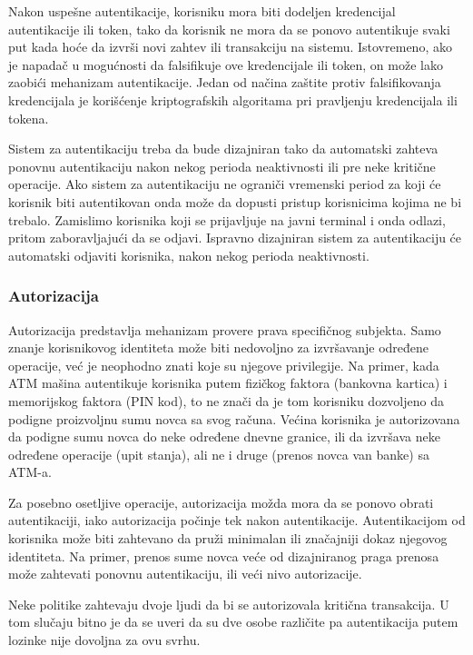 \documentclass[a4paper]{article}
\begin{document}
Nakon uspešne autentikacije, korisniku mora biti 
dodeljen kredencijal autentikacije ili token, tako da korisnik 
ne mora da se ponovo autentikuje svaki put kada hoće da izvrši novi zahtev ili transakciju na sistemu. 
Istovremeno, ako je napadač u mogućnosti da falsifikuje ove kredencijale ili token, on može lako zaobići 
mehanizam autentikacije. Jedan od načina zaštite protiv falsifikovanja kredencijala je korišćenje 
kriptografskih algoritama pri pravljenju kredencijala ili tokena.

Sistem za autentikaciju treba da bude dizajniran tako da automatski zahteva ponovnu autentikaciju nakon nekog 
perioda neaktivnosti ili pre neke kritične operacije.
Ako sistem za autentikaciju ne ograniči vremenski period za koji će korisnik biti autentikovan onda može 
da dopusti pristup korisnicima kojima ne bi trebalo. Zamislimo korisnika koji se prijavljuje na javni terminal
i onda odlazi, pritom zaboravljajući da se odjavi. Ispravno dizajniran sistem za autentikaciju 
će automatski odjaviti korisnika, nakon nekog perioda neaktivnosti.

\subsubsection{Autorizacija}
Autorizacija predstavlja mehanizam provere prava specifičnog subjekta.
Samo znanje korisnikovog identiteta može biti nedovoljno za izvršavanje određene operacije, već je neophodno znati koje su njegove privilegije.
Na primer, kada ATM mašina autentikuje korisnika putem fizičkog faktora (bankovna kartica) i memorijskog faktora (PIN kod),
to ne znači da je tom korisniku dozvoljeno da podigne proizvoljnu sumu novca sa svog računa. Većina korisnika je autorizovana 
da podigne sumu novca do neke određene dnevne granice, ili da izvršava neke određene operacije (upit stanja), 
ali ne i druge (prenos novca van banke) sa ATM-a.
 
Za posebno osetljive operacije, autorizacija možda mora da se ponovo obrati autentikaciji, iako autorizacija počinje tek 
nakon autentikacije. Autentikacijom od korisnika može biti zahtevano da pruži minimalan ili značajniji dokaz njegovog identiteta. 
Na primer, prenos sume novca veće od dizajniranog praga prenosa može zahtevati ponovnu autentikaciju, ili veći nivo autorizacije.

Neke politike zahtevaju dvoje ljudi da bi se autorizovala kritična transakcija. U tom slučaju 
bitno je da se uveri da su dve osobe različite pa autentikacija putem lozinke nije dovoljna za ovu svrhu.
\end{document}

